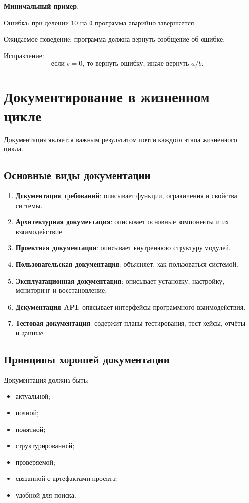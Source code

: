 \documentclass[12pt,a4paper]{article}
\begin{document}
\textbf{Минимальный пример}.

Ошибка: при делении $10$ на $0$ программа аварийно завершается.

Ожидаемое поведение: программа должна вернуть сообщение об ошибке.

Исправление:
\[
\text{если } b = 0,\ \text{то вернуть ошибку, иначе вернуть } a/b.
\]

\section{Документирование в жизненном цикле}

Документация является важным результатом почти каждого этапа жизненного цикла.

\subsection{Основные виды документации}

\begin{enumerate}
    \item \textbf{Документация требований}: описывает функции, ограничения и свойства системы.
    \item \textbf{Архитектурная документация}: описывает основные компоненты и их взаимодействие.
    \item \textbf{Проектная документация}: описывает внутреннюю структуру модулей.
    \item \textbf{Пользовательская документация}: объясняет, как пользоваться системой.
    \item \textbf{Эксплуатационная документация}: описывает установку, настройку, мониторинг и восстановление.
    \item \textbf{Документация API}: описывает интерфейсы программного взаимодействия.
    \item \textbf{Тестовая документация}: содержит планы тестирования, тест-кейсы, отчёты и данные.
\end{enumerate}

\subsection{Принципы хорошей документации}

Документация должна быть:
\begin{itemize}
    \item актуальной;
    \item полной;
    \item понятной;
    \item структурированной;
    \item проверяемой;
    \item связанной с артефактами проекта;
    \item удобной для поиска.
\end{itemize}
\end{document}
